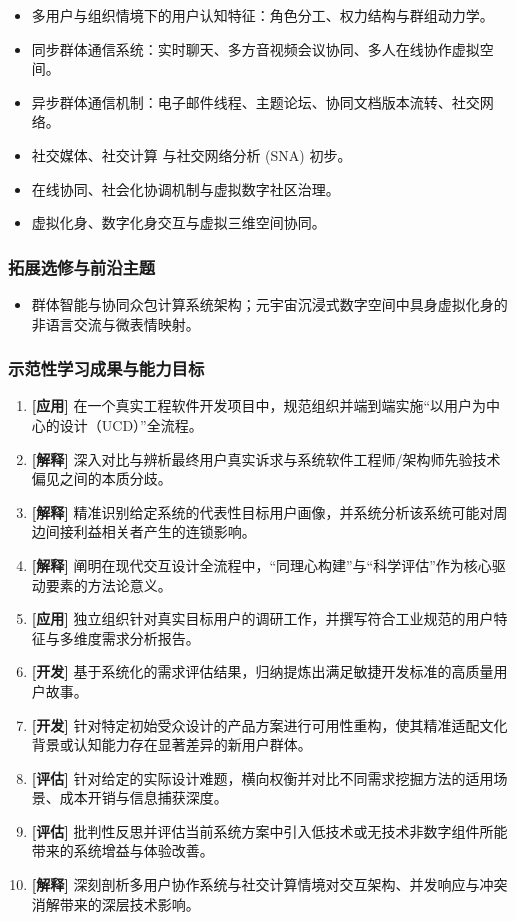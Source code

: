 \begin{itemize}
    \begin{itemize}
        \item 多用户与组织情境下的用户认知特征：角色分工、权力结构与群组动力学。
        \item 同步群体通信系统：实时聊天、多方音视频会议协同、多人在线协作虚拟空间。
        \item 异步群体通信机制：电子邮件线程、主题论坛、协同文档版本流转、社交网络。
        \item 社交媒体、社交计算 与社交网络分析 (SNA) 初步。
        \item 在线协同、社会化协调机制与虚拟数字社区治理。
        \item 虚拟化身、数字化身交互与虚拟三维空间协同。
    \end{itemize}
\end{itemize}

\subsubsection{拓展选修与前沿主题}
\begin{itemize}
    \item 群体智能与协同众包计算系统架构；元宇宙沉浸式数字空间中具身虚拟化身的非语言交流与微表情映射。
\end{itemize}

\subsubsection{示范性学习成果与能力目标}
\begin{enumerate}
    \item \textbf{[应用]} 在一个真实工程软件开发项目中，规范组织并端到端实施“以用户为中心的设计（UCD）”全流程。
    \item \textbf{[解释]} 深入对比与辨析最终用户真实诉求与系统软件工程师/架构师先验技术偏见之间的本质分歧。
    \item \textbf{[解释]} 精准识别给定系统的代表性目标用户画像，并系统分析该系统可能对周边间接利益相关者产生的连锁影响。
    \item \textbf{[解释]} 阐明在现代交互设计全流程中，“同理心构建”与“科学评估”作为核心驱动要素的方法论意义。
    \item \textbf{[应用]} 独立组织针对真实目标用户的调研工作，并撰写符合工业规范的用户特征与多维度需求分析报告。
    \item \textbf{[开发]} 基于系统化的需求评估结果，归纳提炼出满足敏捷开发标准的高质量用户故事。
    \item \textbf{[开发]} 针对特定初始受众设计的产品方案进行可用性重构，使其精准适配文化背景或认知能力存在显著差异的新用户群体。
    \item \textbf{[评估]} 针对给定的实际设计难题，横向权衡并对比不同需求挖掘方法的适用场景、成本开销与信息捕获深度。
    \item \textbf{[评估]} 批判性反思并评估当前系统方案中引入低技术或无技术非数字组件所能带来的系统增益与体验改善。
    \item \textbf{[解释]} 深刻剖析多用户协作系统与社交计算情境对交互架构、并发响应与冲突消解带来的深层技术影响。
\end{enumerate}

